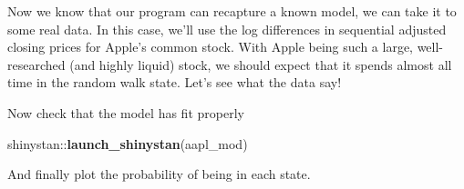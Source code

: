 \documentclass[]{book}
\newenvironment{Shaded}{\begin{snugshade}}{\end{snugshade}}
\newcommand{\KeywordTok}[1]{\textcolor[rgb]{0.13,0.29,0.53}{\textbf{{#1}}}}
\newcommand{\DataTypeTok}[1]{\textcolor[rgb]{0.13,0.29,0.53}{{#1}}}
\newcommand{\DecValTok}[1]{\textcolor[rgb]{0.00,0.00,0.81}{{#1}}}
\newcommand{\StringTok}[1]{\textcolor[rgb]{0.31,0.60,0.02}{{#1}}}
\newcommand{\CommentTok}[1]{\textcolor[rgb]{0.56,0.35,0.01}{\textit{{#1}}}}
\newcommand{\OtherTok}[1]{\textcolor[rgb]{0.56,0.35,0.01}{{#1}}}
\newcommand{\NormalTok}[1]{{#1}}
\begin{document}
Now we know that our program can recapture a known model, we can take it
to some real data. In this case, we'll use the log differences in
sequential adjusted closing prices for Apple's common stock. With Apple
being such a large, well-researched (and highly liquid) stock, we should
expect that it spends almost all time in the random walk state. Let's
see what the data say!

\begin{Shaded}
\end{Shaded}

Now check that the model has fit properly

\begin{Shaded}
\begin{Highlighting}[]
\NormalTok{shinystan::}\KeywordTok{launch_shinystan}\NormalTok{(aapl_mod)}
\end{Highlighting}
\end{Shaded}

And finally plot the probability of being in each state.
\end{document}
